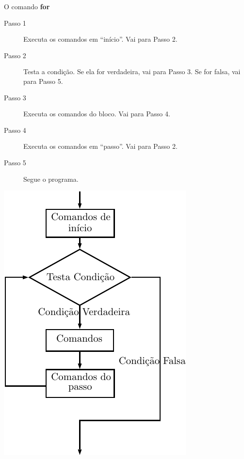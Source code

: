 \documentclass[handout]{beamer}
\begin{document}
\begin{frame}[fragile]{O comando {\bf for}}

    \begin{minipage}{0.55\textwidth}
        \small
        \begin{description}
            \item[Passo 1] Executa os comandos em ``início''. Vai para Passo 2.
            \item[Passo 2] Testa a condição. Se ela for verdadeira, vai para Passo 3. Se for falsa, vai para Passo 5.
            \item[Passo 3] Executa os comandos do bloco. Vai para Passo 4.
            \item[Passo 4] Executa os comandos em ``passo''. Vai para Passo 2.
            \item[Passo 5] Segue o programa.
        \end{description}
    \end{minipage}
    \hfill
    \begin{minipage}{0.4\textwidth}
        \includegraphics[width=\textwidth]{figs/for}
    \end{minipage}
\end{frame}
\end{document}
